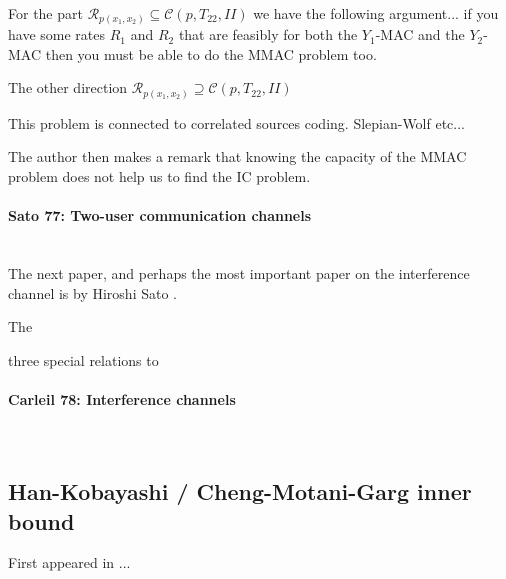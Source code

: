 \documentclass[aps,11pt,twoside,letterpaper]{article}
\begin{document}
             \\
            For the part $\mathcal{R}_{p(x_1,x_2)} \subseteq \mathcal{C}(p,T_{22},II)$ we have the following argument...
            if you have some rates $R_1$ and $R_2$ that are feasibly for both the $Y_1$-MAC and the $Y_2$-MAC then
            you must be able to do the MMAC problem too.
            
            The other direction $\mathcal{R}_{p(x_1,x_2)} \supseteq \mathcal{C}(p,T_{22},II)$  



            This problem is connected to correlated sources coding. Slepian-Wolf etc...


            The author then makes a remark that knowing the capacity of the MMAC problem
            does not help us to find the IC problem.
            




        \paragraph{Sato 77: Two-user communication channels} \ \\

            The next paper, and perhaps the most important paper on the interference channel is
            by Hiroshi Sato \cite{Sato77}.

            The 
            
            three special relations to 

        \paragraph{Carleil 78: Interference channels} \ \\




        
    \subsection{Han-Kobayashi / Cheng-Motani-Garg inner bound}

        First appeared in ...
\end{document}
